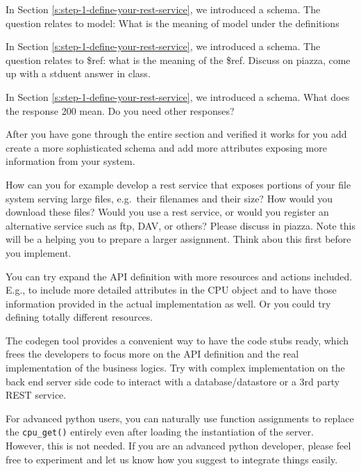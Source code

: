\begin{exercise}
  In Section \ref{s:step-1-define-your-rest-service}, we introduced a
  schema. The question relates to model: What is the meaning of model
  under the definitions
\end{exercise}

\begin{exercise}
  In Section \ref{s:step-1-define-your-rest-service}, we introduced a
  schema. The question relates to \$ref: what is the meaning of the
  \$ref. Discuss on piazza, come up with a stduent answer in class.
\end{exercise}

\begin{exercise}
  In Section \ref{s:step-1-define-your-rest-service}, we introduced a
  schema.  What does the response 200 mean. Do you need other
  responses?
\end{exercise}

\begin{exercise}
  After you have gone through the entire section and verified it works
  for you add create a more sophisticated schema and add more attributes
  exposing more information from your system.
\end{exercise}

\begin{exercise}
  How can you for example develop a rest service that exposes portions
  of your file system serving large files, e.g.~their filenames and
  their size? How would you download these files? Would you use a rest
  service, or would you register an alternative service such as ftp,
  DAV, or others? Please discuss in piazza. Note this will be a helping
  you to prepare a larger assignment. Think abou this first before you
  implement.
\end{exercise}


\begin{exercise}
You can try expand the API definition with more resources and
actions included. E.g., to include more detailed attributes in the CPU
object and to have those information provided in the actual
implementation as well. Or you could try defining totally different
resources.
\end{exercise}

\begin{exercise}
The codegen tool provides a convenient way to have the code
stubs ready, which frees the developers to focus more on the API
definition and the real implementation of the business logics. Try with
complex implementation on the back end server side code to interact with
a database/datastore or a 3rd party REST service.
\end{exercise}

\begin{exercise}
For advanced python users, you can naturally use function assignments to
replace the \texttt{cpu\_get()} entirely even after loading the
instantiation of the server. However, this is not needed. If you are an
advanced python developer, please feel free to experiment and let us
know how you suggest to integrate things easily.
\end{exercise}